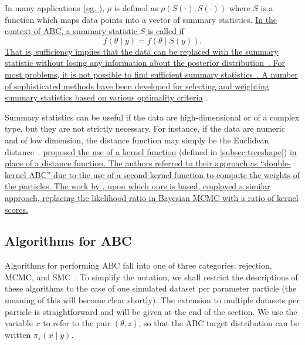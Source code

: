 {In many applications {\color{blue}\uline{(eg. \autocite{fu1997estimating,
tanaka2006using})}}, $\rho$ is defined as $\rho(S(\cdot), S(\cdot))$ where $S$
is a function which maps data points into a vector of summary statistics.
{\color{blue}\uline{In the context of \gls{ABC}, a summary statistic $S$ is
called  if} 
\[
  f(\theta \mid y) = f(\theta \mid S(y)).
\]
\uline{That is, sufficiency implies that the data can be replaced with the
summary statistic without losing any information about the posterior
distribution~\autocite{marjoram2006modern}. For most problems, it is not
possible to find sufficient summary statistics~\autocite{marjoram2006modern}.
A number of sophisticated methods have been developed for selecting and
weighting summary statistics based on various optimality criteria}
\autocite[][and references therein]{aeschbacher2012novel,
blum2013comparative}}.

Summary statistics can be useful if the data are high-dimensional or of a
complex type, but they are not strictly necessary. For instance, if the data
are numeric and of low dimension, the distance function may simply be the
Euclidean distance~\autocite{sisson2007sequential}.
{\color{blue}\textcite{park2015k2} \uline{proposed the use of a kernel function}
(defined in \cref{subsec:treeshape}) \uline{in place of a distance function.
The authors referred to their approach as ``double-kernel \gls{ABC}'' due to
the use of a second kernel function to compute the weights of the particles.
The work by \textcite{poon2015phylodynamic}, upon which ours is based, employed
a similar approach, replacing the likelihood ratio in Bayesian \gls{MCMC} with
a ratio of kernel scores.}}

\subsection{Algorithms for ABC}
\label{subsec:abcalg}

Algorithms for performing \gls{ABC} fall into one of three categories:
rejection, \gls{MCMC}, and \gls{SMC}~\autocite{marin2012approximate}. To
simplify the notation, we shall restrict the descriptions of these algorithms
to the case of one simulated dataset per parameter particle (the meaning of
this will become clear shortly). The extension to multiple datasets per
particle is straightforward and will be given at the end of the section. We use
the variable $x$ to refer to the pair $(\theta, z)$, so that the \gls{ABC}
target distribution can be written $\pi_\varepsilon(x \mid y)$.

}
